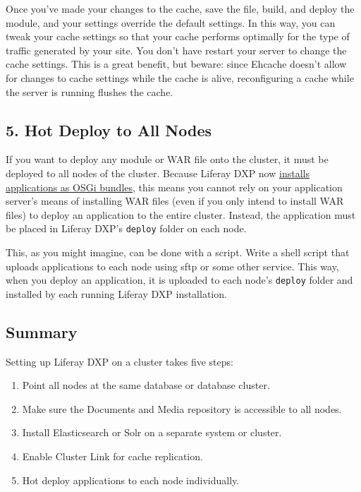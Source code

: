 Once you've made your changes to the cache, save the file, build, and
deploy the module, and your settings override the default settings. In
this way, you can tweak your cache settings so that your cache performs
optimally for the type of traffic generated by your site. You don't have
restart your server to change the cache settings. This is a great
benefit, but beware: since Ehcache doesn't allow for changes to cache
settings while the cache is alive, reconfiguring a cache while the
server is running flushes the cache.

\subsection{5. Hot Deploy to All
Nodes}\label{hot-deploy-to-all-nodes}

If you want to deploy any module or WAR file onto the cluster, it must
be deployed to all nodes of the cluster. Because Liferay DXP now
\href{/docs/7-0/tutorials/-/knowledge_base/t/using-the-wab-generator}{installs
applications as OSGi bundles}, this means you cannot rely on your
application server's means of installing WAR files (even if you only
intend to install WAR files) to deploy an application to the entire
cluster. Instead, the application must be placed in Liferay DXP's
\texttt{deploy} folder on each node.

This, as you might imagine, can be done with a script. Write a shell
script that uploads applications to each node using sftp or some other
service. This way, when you deploy an application, it is uploaded to
each node's \texttt{deploy} folder and installed by each running Liferay
DXP installation.

\subsection{Summary}\label{summary}

Setting up Liferay DXP on a cluster takes five steps:

\begin{enumerate}
\def\labelenumi{\arabic{enumi}.}
\item
  Point all nodes at the same database or database cluster.
\item
  Make sure the Documents and Media repository is accessible to all
  nodes.
\item
  Install Elasticsearch or Solr on a separate system or cluster.
\item
  Enable Cluster Link for cache replication.
\item
  Hot deploy applications to each node individually.
\end{enumerate}

